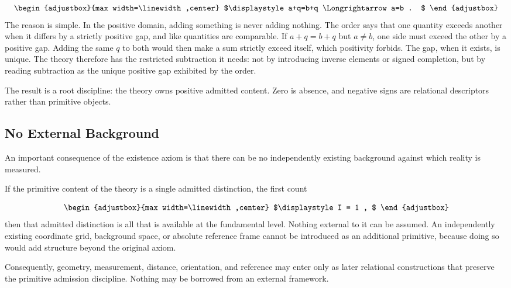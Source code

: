 \begin{equation*}
\begin{adjustbox}{max width=\linewidth,center}
$\displaystyle
a+q=b+q \Longrightarrow a=b .
$
\end{adjustbox}
\end{equation*}
The reason is simple. In the positive domain, adding something is never adding nothing. The order says that one quantity exceeds another when it differs by a strictly positive gap, and like quantities are comparable. If \(a+q=b+q\) but \(a\neq b\), one side must exceed the other by a positive gap. Adding the same \(q\) to both would then make a sum strictly exceed itself, which positivity forbids. The gap, when it exists, is unique. The theory therefore has the restricted subtraction it needs: not by introducing inverse elements or signed completion, but by reading subtraction as the unique positive gap exhibited by the order.

The result is a root discipline: the theory owns positive admitted content. Zero is absence, and negative signs are relational descriptors rather than primitive objects.

\subsection{No External Background}
An important consequence of the existence axiom is that there can be no independently existing background against which reality is measured.

If the primitive content of the theory is a single admitted distinction, the first count

\begin{equation*}
\begin{adjustbox}{max width=\linewidth,center}
$\displaystyle
I = 1 ,
$
\end{adjustbox}
\end{equation*}
then that admitted distinction is all that is available at the fundamental level. Nothing external to it can be assumed. An independently existing coordinate grid, background space, or absolute reference frame cannot be introduced as an additional primitive, because doing so would add structure beyond the original axiom.

Consequently, geometry, measurement, distance, orientation, and reference may enter only as later relational constructions that preserve the primitive admission discipline. Nothing may be borrowed from an external framework.

